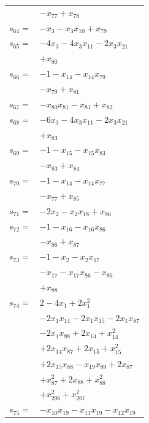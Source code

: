 \begin{longtable}{@{}r@{\;}l@{}}
 & \(\displaystyle -x_{77} +x_{78}\) \\[3pt]
\(s_{64}=\) & \(\displaystyle -x_{3} -x_{3}x_{10} +x_{79}\) \\[3pt]
\(s_{65}=\) & \(\displaystyle -4x_{3} -4x_{3}x_{11} -2x_{3}x_{21}\) \\
 & \(\displaystyle +x_{80}\) \\[3pt]
\(s_{66}=\) & \(\displaystyle -1 -x_{14} -x_{14}x_{79}\) \\
 & \(\displaystyle -x_{79} +x_{81}\) \\[3pt]
\(s_{67}=\) & \(\displaystyle -x_{80}x_{81} -x_{81} +x_{82}\) \\[3pt]
\(s_{68}=\) & \(\displaystyle -6x_{3} -4x_{3}x_{11} -2x_{3}x_{21}\) \\
 & \(\displaystyle +x_{83}\) \\[3pt]
\(s_{69}=\) & \(\displaystyle -1 -x_{15} -x_{15}x_{83}\) \\
 & \(\displaystyle -x_{83} +x_{84}\) \\[3pt]
\(s_{70}=\) & \(\displaystyle -1 -x_{14} -x_{14}x_{77}\) \\
 & \(\displaystyle -x_{77} +x_{85}\) \\[3pt]
\(s_{71}=\) & \(\displaystyle -2x_{2} -x_{2}x_{18} +x_{86}\) \\[3pt]
\(s_{72}=\) & \(\displaystyle -1 -x_{16} -x_{16}x_{86}\) \\
 & \(\displaystyle -x_{86} +x_{87}\) \\[3pt]
\(s_{73}=\) & \(\displaystyle -1 -x_{2} -x_{2}x_{17}\) \\
 & \(\displaystyle -x_{17} -x_{17}x_{86} -x_{86}\) \\
 & \(\displaystyle +x_{88}\) \\[3pt]
\(s_{74}=\) & \(\displaystyle 2 -4x_{1} +2x_{1}^{2}\) \\
 & \(\displaystyle -2x_{1}x_{14} -2x_{1}x_{15} -2x_{1}x_{87}\) \\
 & \(\displaystyle -2x_{1}x_{88} +2x_{14} +x_{14}^{2}\) \\
 & \(\displaystyle +2x_{14}x_{87} +2x_{15} +x_{15}^{2}\) \\
 & \(\displaystyle +2x_{15}x_{88} -x_{19}x_{89} +2x_{87}\) \\
 & \(\displaystyle +x_{87}^{2} +2x_{88} +x_{88}^{2}\) \\
 & \(\displaystyle +x_{206}^{2} +x_{207}^{2}\) \\[3pt]
\(s_{75}=\) & \(\displaystyle -x_{10}x_{19} -x_{11}x_{19} -x_{12}x_{19}\) \\

\end{longtable}

